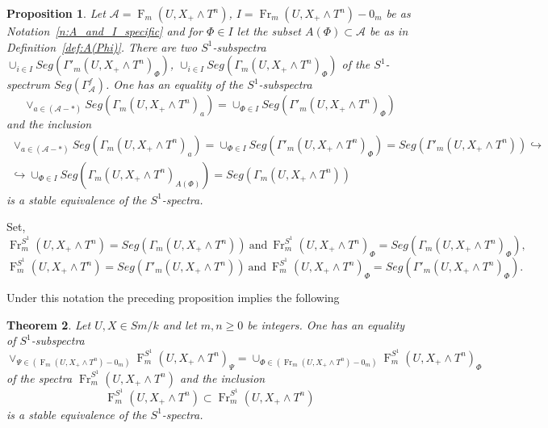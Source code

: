 \documentclass[a4paper,11pt,reqno]{amsart}
\newtheorem{theorem}{Theorem}[section]
\newtheorem{proposition}[theorem]{Proposition}
\begin{document}
\begin{proposition}
Let $\mathcal A={\operatorname{F}}_m(U,X_+\wedge T^n)$, $I={\operatorname{Fr}}_m(U,X_+\wedge
T^n)-0_m$ be as Notation~\ref{n:A_and_I_specific} and for $\Phi\in
I$ let the subset $A(\Phi)\subset \mathcal A$ be as in
Definition~\ref{def:A(Phi)}. There are two $S^1$-subspectra
$\cup_{i\in I}Seg(\Gamma'_m(U,X_+\wedge T^n)_{\Phi})$, $\cup_{i\in
I}Seg(\Gamma_m(U,X_+\wedge T^n)_{\Phi})$ of the $S^1$-spectrum
$Seg(\Gamma^f_{\mathcal A})$. One has an equality of the
$S^1$-subspectra
   $$\vee_{a \in (\mathcal A-*)}Seg(\Gamma_m(U,X_+\wedge T^n)_a)=\cup_{\Phi\in I}Seg(\Gamma'_m(U,X_+\wedge T^n)_{\Phi})$$
and the inclusion
\begin{multline*}
\vee_{a\in (\mathcal A-*)}Seg(\Gamma_m(U,X_+\wedge T^n)_a)=\cup_{\Phi\in I}Seg(\Gamma'_m(U,X_+\wedge T^n)_{\Phi})=Seg(\Gamma'_m(U,X_+\wedge T^n)) \hookrightarrow \\
\hookrightarrow \cup_{\Phi\in I}Seg(\Gamma_m(U,X_+\wedge T^n)_{A(\Phi)})=Seg(\Gamma_m(U,X_+\wedge T^n))
\end{multline*}
is a stable equivalence of the $S^1$-spectra.
\end{proposition}

Set,
   $${\operatorname{Fr}}^{S^1}_m(U,X_+\wedge T^n)=Seg(\Gamma_m(U,X_+\wedge T^n)) \ \text{and} \ {\operatorname{Fr}}^{S^1}_m(U,X_+\wedge T^n)_{\Phi}=Seg(\Gamma_m(U,X_+\wedge T^n)_{\Phi}),$$
   $${\operatorname{F}}^{S^1}_m(U,X_+\wedge T^n)=Seg(\Gamma'_m(U,X_+\wedge T^n)) \ \text{and} \  {\operatorname{F}}^{S^1}_m(U,X_+\wedge T^n)_{\Phi}=Seg(\Gamma'_m(U,X_+\wedge T^n)_{\Phi}).$$

Under this notation the preceding proposition implies the following

\begin{theorem}\label{p:Fr_and_F}
Let $U,X\in Sm/k$ and let $m,n{\geqslant} 0$ be integers. One has an
equality of $S^1$-subspectra
$$\vee_{\Psi \in ({\operatorname{F}}_m(U,X_+\wedge T^n)-0_m)}{\operatorname{F}}^{S^1}_m(U,X_+\wedge T^n)_{\Psi}=\cup_{\Phi\in ({\operatorname{Fr}}_m(U,X_+\wedge T^n)-0_m)}{\operatorname{F}}^{S^1}_m(U,X_+\wedge T^n)_{\Phi}$$
of the spectra ${\operatorname{Fr}}^{S^1}_m(U,X_+\wedge T^n)$ and the inclusion
\begin{equation}\label{eq:F_S1_and_Fr_S1}
{\operatorname{F}}^{S^1}_m(U,X_+\wedge T^n)\subset {\operatorname{Fr}}^{S^1}_m(U,X_+\wedge T^n)
\end{equation}
is a stable equivalence of the $S^1$-spectra.
\end{theorem}
\end{document}
